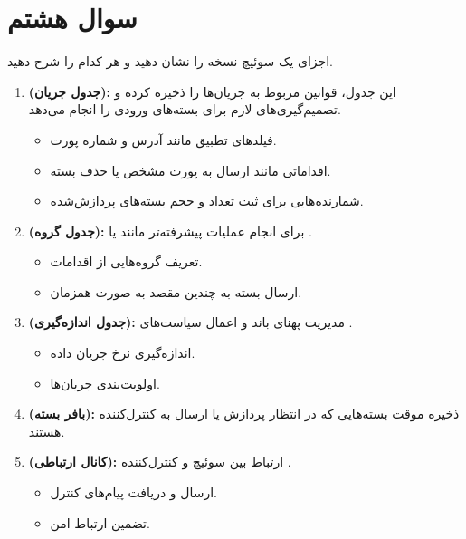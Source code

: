 \section{سوال هشتم}

اجزای یک سوئیچ  نسخه  را نشان دهید و هر کدام را شرح دهید.


\begin{qsolve}
	 \begin{enumerate}
	 	\item \textbf{ (جدول جریان):} 
	 	این جدول، قوانین مربوط به جریان‌ها را ذخیره کرده و تصمیم‌گیری‌های لازم برای بسته‌های ورودی را انجام می‌دهد.
	 	\begin{itemize}
	 		\item {} فیلدهای تطبیق مانند آدرس  و شماره پورت.
	 		\item {} اقداماتی مانند ارسال به پورت مشخص یا حذف بسته.
	 		\item {} شمارنده‌هایی برای ثبت تعداد و حجم بسته‌های پردازش‌شده.
	 	\end{itemize}
	 	
	 	\item \textbf{ (جدول گروه):} 
	 	برای انجام عملیات پیشرفته‌تر مانند  یا .
	 	\begin{itemize}
	 		\item تعریف گروه‌هایی از اقدامات.
	 		\item ارسال بسته به چندین مقصد به صورت همزمان.
	 	\end{itemize}
	 	
	 	\item \textbf{ (جدول اندازه‌گیری):} 
	 	مدیریت پهنای باند و اعمال سیاست‌های .
	 	\begin{itemize}
	 		\item اندازه‌گیری نرخ جریان داده.
	 		\item اولویت‌بندی جریان‌ها.
	 	\end{itemize}
	 	
	 	\item \textbf{ (بافر بسته):} 
	 	ذخیره موقت بسته‌هایی که در انتظار پردازش یا ارسال به کنترل‌کننده هستند.
	 	
	 	\item \textbf{ (کانال ارتباطی):} 
	 	ارتباط بین سوئیچ و کنترل‌کننده .
	 	\begin{itemize}
	 		\item ارسال و دریافت پیام‌های کنترل.
	 		\item تضمین ارتباط امن.
	 	\end{itemize}
	 	

\end{enumerate}
\end{qsolve}
